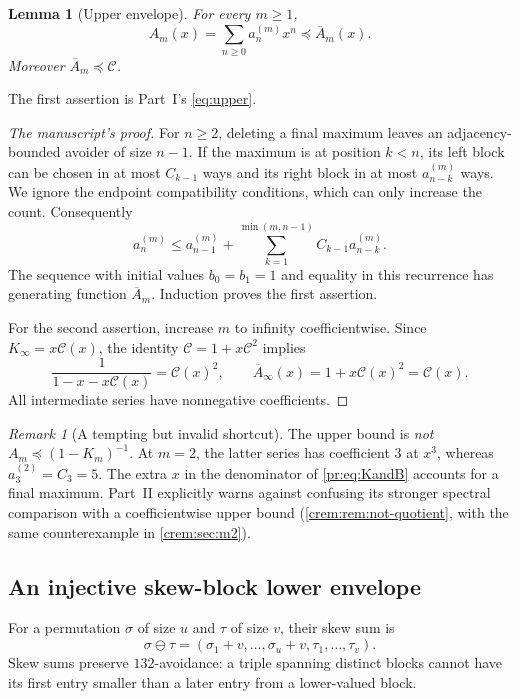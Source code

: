 \documentclass[11pt,a4paper]{article}
\newtheorem{lemma}[lemma]{Lemma}
\theoremstyle{definition}\newaliascnt{definition}{theorem}
\theoremstyle{remark}\newaliascnt{remark}{theorem}
\newtheorem{remark}[remark]{Remark}
\newcommand{\Cat}{\mathcal C}
\newcommand{\preceqc}{\preceq}
\begin{document}
\begin{lemma}[Upper envelope]\label{pr:lem:upper}
For every $m\ge1$,
\begin{equation}
 A_m(x)=\sum_{n\ge0}a_n^{(m)}x^n\preceqc\overline A_m(x).
 \label{pr:eq:upper}
\end{equation}
Moreover $\overline A_m\preceqc\Cat$.
\end{lemma}
The first assertion is Part~I's \eqref{eq:upper}.
\begin{proof}[The manuscript's proof]
For $n\ge2$, deleting a final maximum leaves an adjacency-bounded avoider of
size $n-1$. If the maximum is at position $k<n$, its left block can be chosen
in at most $C_{k-1}$ ways and its right block in at most $a_{n-k}^{(m)}$
ways. We ignore the endpoint compatibility conditions, which can only
increase the count. Consequently
\begin{equation}
 a_n^{(m)}\le a_{n-1}^{(m)}+
 \sum_{k=1}^{\min(m,n-1)}C_{k-1}a_{n-k}^{(m)}.
 \label{pr:eq:upperrec}
\end{equation}
The sequence with initial values $b_0=b_1=1$ and equality in this
recurrence has generating function $\overline A_m$. Induction proves the
first assertion.

For the second assertion, increase $m$ to infinity coefficientwise. Since
$K_\infty=x\Cat(x)$, the identity $\Cat=1+x\Cat^2$ implies
\[
 \frac1{1-x-x\Cat(x)}=\Cat(x)^2,
 \qquad \overline A_\infty(x)=1+x\Cat(x)^2=\Cat(x).
\]
All intermediate series have nonnegative coefficients.
\end{proof}

\begin{remark}[A tempting but invalid shortcut]\label{pr:rem:falsemajorant}
The upper bound is \emph{not} $A_m\preceqc(1-K_m)^{-1}$. At $m=2$, the latter
series has coefficient $3$ at $x^3$, whereas $a_3^{(2)}=C_3=5$. The extra $x$
in the denominator of \eqref{pr:eq:KandB} accounts for a final maximum.
Part~II explicitly warns against confusing its stronger spectral comparison
with a coefficientwise upper bound (\cref{crem:rem:not-quotient}, with the
same counterexample in \cref{crem:sec:m2}).
\end{remark}

\subsection{An injective skew-block lower envelope}
For a permutation $\sigma$ of size $u$ and $\tau$ of size $v$, their skew sum
is
\[
 \sigma\ominus\tau=(\sigma_1+v,\ldots,\sigma_u+v,\tau_1,\ldots,\tau_v).
\]
Skew sums preserve $132$-avoidance: a triple spanning distinct blocks cannot
have its first entry smaller than a later entry from a lower-valued block.
\end{document}
